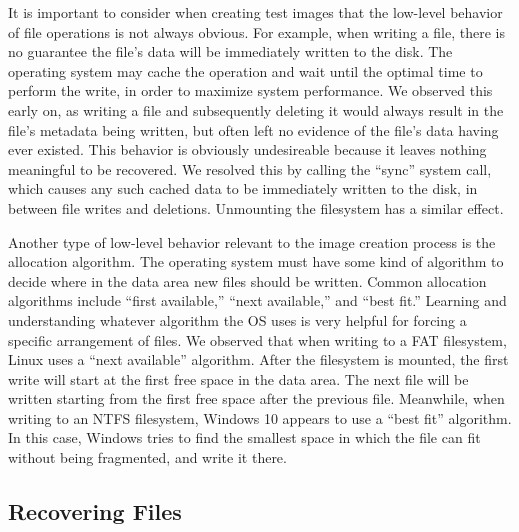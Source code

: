 It is important to consider when creating test images that the low-level behavior of file operations is not always obvious. For example, when writing a file, there is no guarantee the file's data will be immediately written to the disk. The operating system may cache the operation and wait until the optimal time to perform the write, in order to maximize system performance. We observed this early on, as writing a file and subsequently deleting it would always result in the file's metadata being written, but often left no evidence of the file's data having ever existed. This behavior is obviously undesireable because it leaves nothing meaningful to be recovered. We resolved this by calling the ``sync'' system call, which causes any such cached data to be immediately written to the disk, in between file writes and deletions. Unmounting the filesystem has a similar effect.

Another type of low-level behavior relevant to the image creation process is the allocation algorithm. The operating system must have some kind of algorithm to decide where in the data area new files should be written. Common allocation algorithms include ``first available,'' ``next available,'' and ``best fit.'' %
Learning and understanding whatever algorithm the OS uses is very helpful for forcing a specific arrangement of files. We observed that when writing to a FAT filesystem, Linux uses a ``next available'' algorithm. After the filesystem is mounted, the first write will start at the first free space in the data area. The next file will be written starting from the first free space after the previous file.
Meanwhile, when writing to an NTFS filesystem, Windows 10 appears to use a ``best fit'' algorithm. In this case, Windows tries to find the smallest space in which the file can fit without being fragmented, and write it there.


\subsection{Recovering Files}


